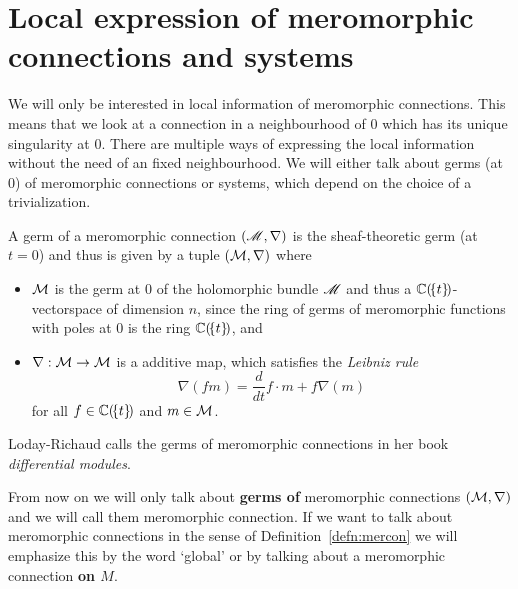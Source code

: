 \section{Local expression of meromorphic connections and systems}
We will only be interested in local information of meromorphic connections.
This means that we look at a connection in a neighbourhood of $0$ which has its
unique singularity at $0$.
There are multiple ways of expressing the local information without the need of
an fixed neighbourhood.
We will either talk about germs (at $0$) of meromorphic connections or systems,
which depend on the choice of a trivialization.
\begin{prop}
  A germ of a meromorphic connection $(\mathscr{M},\nabla)$ is the sheaf-theoretic
  germ (at $t=0$) and thus is given by a tuple $(\mathcal{M},\nabla)$ where
  \begin{itemize}
    \item $\mathcal{M}$ is the germ at $0$ of the holomorphic bundle $\mathscr{M}$ and thus a
      $\mathbb{C}(\!\{t\}\!)$-vectorspace of dimension $n$, since the ring of germs of
      meromorphic functions with poles at $0$ is the ring $\mathbb{C}(\!\{t\}\!)$, and
    \item $\nabla:\mathcal{M}\to \mathcal{M}$ is a additive map, which
      satisfies the \emph{Leibniz rule}
      \[
        \nabla(fm)=\frac{d}{dt} f\cdot m + f\nabla(m)
      \]
      for all $f\in\mathbb{C}(\!\{t\}\!)$ and $m\in \mathcal{M}$.
  \end{itemize}
  \begin{s-rem}
    Loday-Richaud calls the germs of meromorphic connections in her
    book~\cite[Def.4.2.1]{Loday2014} \emph{differential modules}.
  \end{s-rem}
\end{prop}
\begin{rem}\label{rem:GlobalNothingGerm}
  From now on we will only talk about \textbf{germs of} meromorphic
  connections $(\mathcal{M},\nabla)$ and we will call them meromorphic connection. If
  we want to talk about meromorphic connections in the sense of
  Definition~\ref{defn:mercon} we will emphasize this by the word `global' or
  by talking about a meromorphic connection \textbf{on $M$}.
\end{rem}
